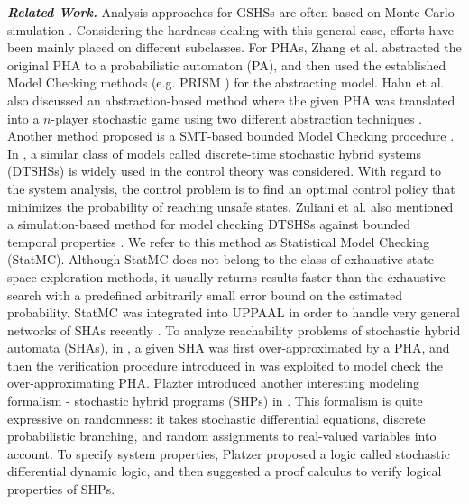 {\it {\bf Related Work.}} Analysis approaches for GSHSs are often based on Monte-Carlo simulation \cite{blom2004particle}. Considering the hardness dealing with this general case, efforts have been mainly placed on different subclasses. For PHAs, Zhang et al. \cite{zhang2012safety} abstracted the original PHA to a probabilistic automaton (PA), and then used the established Model Checking methods (e.g. PRISM \cite{website:prism}) for the abstracting model. Hahn et al. also discussed an abstraction-based method where the given PHA was translated into a $n$-player stochastic game using two different abstraction techniques \cite{hahn2011game}. Another method proposed is a SMT-based bounded Model Checking procedure \cite{franzle2008stochastic}. In \cite{amin2006reachability, abate2007probabilistic, abate2011two, abate2011quantitative}, a similar class of models called discrete-time stochastic hybrid systems (DTSHSs) is widely used in the control theory was considered. With regard to the system analysis, the control problem is to find an optimal control policy that minimizes the probability of reaching unsafe states. Zuliani et al. also mentioned a simulation-based method for model checking DTSHSs against bounded temporal properties \cite{zuliani2010bayesian}. We refer to this method as Statistical Model Checking (StatMC).  Although StatMC does not belong to the class of exhaustive state-space exploration methods, it usually returns results faster than the exhaustive search with a predefined arbitrarily small error bound on the estimated probability. StatMC was integrated into UPPAAL \cite{larsen1997uppaal} in order to handle very general networks of SHAs recently \cite{david2012statistical}. To analyze reachability problems of stochastic hybrid automata (SHAs), in \cite{franzle2011measurability}, a given SHA was first over-approximated by a PHA, and then the verification procedure introduced in \cite{zhang2012safety} was exploited to model check the over-approximating PHA. Plazter introduced another interesting modeling formalism - stochastic hybrid programs (SHPs) in \cite{platzer2011stochastic}. This formalism is quite expressive on randomness: it takes stochastic differential equations, discrete probabilistic branching, and random assignments to real-valued variables into account. To specify system properties, Platzer proposed a logic called stochastic differential dynamic logic, and then suggested a proof calculus to verify logical properties of SHPs. 


